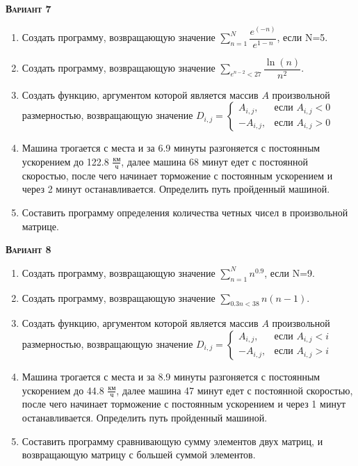 \textsc{\textbf{Вариант 7}}
\begin{enumerate}
\item  Создать программу, возвращающую значение $\sum\limits_{n=1}^{N} \dfrac{e^(-n)}{e^{1-n}}       $, если N=5. 
\item  Создать программу, возвращающую значение $\sum\limits_{e^{n-2}<  27}  \dfrac{\ln(n)}{n^2}          $. 
\item Создать функцию, аргументом которой является массив $A$ произвольной размерностью, возвращающую значение $D_{i,j}=\begin{cases} A_{i,j}, & \text{если } A_{i,j}<0 \\ -A_{i,j}, & \text{если } A_{i,j}>0 \end{cases}                                    $ 
\item Машина трогается с места и за  6.9 минуты разгоняется с постоянным ускорением до 122.8 ${\frac{км}{ч}}$, далее машина   68 минут едет с постоянной скоростью, после чего начинает торможение с постоянным ускорением и через   2 минут останавливается. Определить путь пройденный машиной.  \item Составить программу определения количества четных чисел в произвольной матрице.                                                                                                                                                                                                  

\end{enumerate}
\textsc{\textbf{Вариант 8}}
\begin{enumerate}
\item  Создать программу, возвращающую значение $\sum\limits_{n=1}^{N} {n}^{0.9}                     $, если N=9. 
\item  Создать программу, возвращающую значение $\sum\limits_{0.3n<     38} {n (n-1)}                     $. 
\item Создать функцию, аргументом которой является массив $A$ произвольной размерностью, возвращающую значение $D_{i,j}=\begin{cases} A_{i,j}, & \text{если } {A_{i,j}}<i \\  -A_{i,j}, & \text{если } {A_{i,j}}>i \end{cases}                               $ 
\item Машина трогается с места и за  8.9 минуты разгоняется с постоянным ускорением до 44.8 ${\frac{км}{ч}}$, далее машина   47 минут едет с постоянной скоростью, после чего начинает торможение с постоянным ускорением и через   1 минут останавливается. Определить путь пройденный машиной.  \item Составить программу сравнивающую сумму элементов двух матриц, и возвращающую матрицу с большей суммой элементов.                                                                                                                                      

\end{enumerate}
